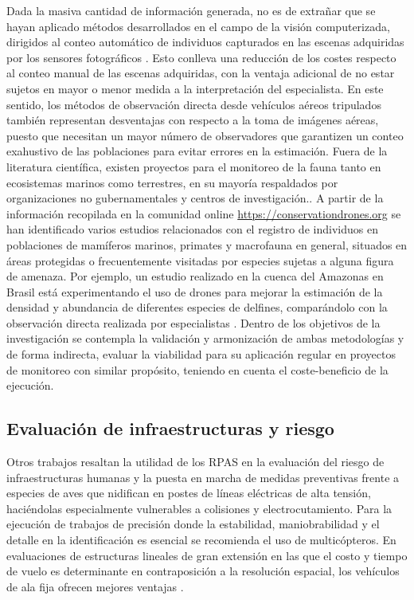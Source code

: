 \documentclass[onecolumn]{extarticle}
\begin{document}
Dada la masiva cantidad de información generada, no es de extrañar que
se hayan aplicado métodos desarrollados en el campo de la visión
computerizada, dirigidos al conteo automático de individuos capturados
en las escenas adquiridas por los sensores fotográficos
\citep{Lhoest2015, Abd-Elrahman2005a, VanGemert2015}. Esto conlleva una
reducción de los costes respecto al conteo manual de las escenas
adquiridas, con la ventaja adicional de no estar sujetos en mayor o
menor medida a la interpretación del especialista. En este sentido, los
métodos de observación directa desde vehículos aéreos tripulados también
representan desventajas con respecto a la toma de imágenes aéreas,
puesto que necesitan un mayor número de observadores que garantizen un
conteo exahustivo de las poblaciones para evitar errores en la
estimación. Fuera de la literatura científica, existen proyectos para el
monitoreo de la fauna tanto en ecosistemas marinos como terrestres, en
su mayoría respaldados por organizaciones no gubernamentales y centros
de investigación.. A partir de la información recopilada en la comunidad
online \url{https://conservationdrones.org} se han identificado varios
estudios relacionados con el registro de individuos en poblaciones de
mamíferos marinos, primates y macrofauna en general, situados en áreas
protegidas o frecuentemente visitadas por especies sujetas a alguna
figura de amenaza. Por ejemplo, un estudio realizado en la cuenca del
Amazonas en Brasil está experimentando el uso de drones para mejorar la
estimación de la densidad y abundancia de diferentes especies de
delfines, comparándolo con la observación directa realizada por
especialistas \citep{WichS2017}. Dentro de los objetivos de la
investigación se contempla la validación y armonización de ambas
metodologías y de forma indirecta, evaluar la viabilidad para su
aplicación regular en proyectos de monitoreo con similar propósito,
teniendo en cuenta el coste-beneficio de la ejecución.

\subsection{Evaluación de infraestructuras y
riesgo}\label{evaluacion-de-infraestructuras-y-riesgo}

Otros trabajos resaltan la utilidad de los RPAS en la evaluación del
riesgo de infraestructuras humanas y la puesta en marcha de medidas
preventivas frente a especies de aves que nidifican en postes de líneas
eléctricas de alta tensión, haciéndolas especialmente vulnerables a
colisiones y electrocutamiento. Para la ejecución de trabajos de
precisión donde la estabilidad, maniobrabilidad y el detalle en la
identificación es esencial \citep{Lobermeier2015} se recomienda el uso
de multicópteros. En evaluaciones de estructuras lineales de gran
extensión en las que el costo y tiempo de vuelo es determinante en
contraposición a la resolución espacial, los vehículos de ala fija
ofrecen mejores ventajas \citep{Mulero-Pazmany2014a, Zhang2016}.
\end{document}

